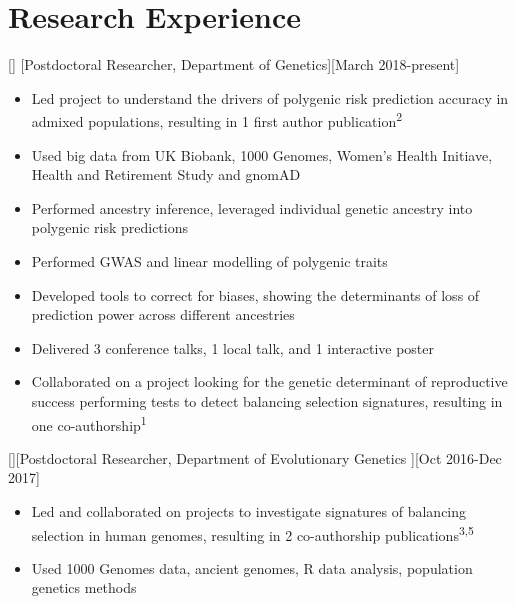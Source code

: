 \documentclass{article}
\begin{document}
\section{Research Experience}

[]
[Postdoctoral Researcher, Department of Genetics][March 2018-present]

\begin{itemize}
\item Led project to understand the drivers of polygenic risk prediction accuracy in admixed populations, resulting in 1 first author publication\textsuperscript{2}
\item Used big data from UK Biobank, 1000 Genomes, Women's Health Initiave, Health and Retirement Study and gnomAD
\item Performed ancestry inference, leveraged individual genetic ancestry into polygenic risk predictions  
\item Performed GWAS and linear modelling of polygenic traits
\item Developed tools to correct for biases, showing the determinants of loss of prediction power across different ancestries
\item Delivered 3 conference talks, 1 local talk, and 1 interactive poster
\item Collaborated on a project looking for the genetic determinant of reproductive success performing tests to detect balancing selection signatures, resulting in one co-authorship\textsuperscript{1}
\end{itemize}

[][Postdoctoral Researcher, Department of Evolutionary Genetics ][Oct 2016-Dec 2017]

\begin{itemize}
\item Led and collaborated on projects to investigate signatures of balancing selection in human genomes, resulting in 2 co-authorship publications\textsuperscript{3,5}
\item Used 1000 Genomes data, ancient genomes, R data analysis, population genetics methods
\end{itemize}
\end{document}
